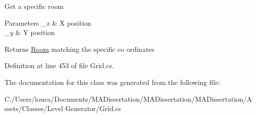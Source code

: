 Get a specific room 


\begin{DoxyParams}{Parameters}
{\em \+\_\+x} & X position\\
\hline
{\em \+\_\+y} & Y position\\
\hline
\end{DoxyParams}
\begin{DoxyReturn}{Returns}
\mbox{\hyperlink{class_level_generation_1_1_room}{Room}} matching the specific co ordinates
\end{DoxyReturn}


Definition at line 453 of file Grid.\+cs.



The documentation for this class was generated from the following file\+:\begin{DoxyCompactItemize}
\item 
C\+:/\+Users/louca/\+Documents/\+M\+A\+Dissertation/\+M\+A\+Dissertation/\+M\+A\+Dissertation/\+Assets/\+Classes/\+Level Generator/Grid.\+cs\end{DoxyCompactItemize}
